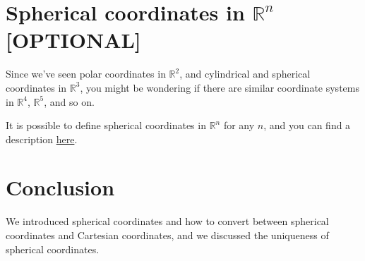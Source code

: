 \documentclass{ximera}
\begin{document}
\section{Spherical coordinates in $\mathbb{R}^n$ [OPTIONAL]}

Since we've seen polar coordinates in $\mathbb{R}^2$, and cylindrical and spherical coordinates in $\mathbb{R}^3$, you might be wondering if there are similar coordinate systems in $\mathbb{R}^4$, $\mathbb{R}^5$, and so on.

It is possible to define spherical coordinates in $\mathbb{R}^n$ for any $n$, and you can find a description \href{https://en.wikipedia.org/wiki/N-sphere#Spherical_coordinates
}{here}. 

\section{Conclusion}

We introduced spherical coordinates and how to convert between spherical coordinates and Cartesian coordinates, and we discussed the uniqueness of spherical coordinates.
\end{document}
